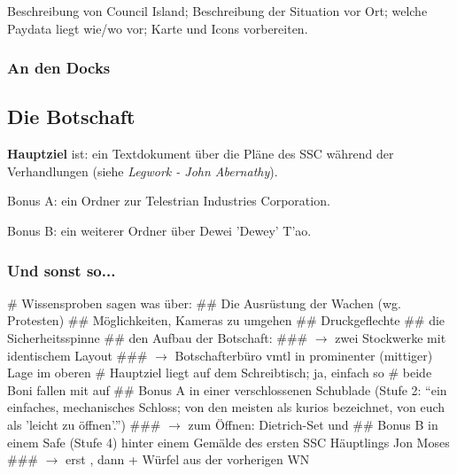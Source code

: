 Beschreibung von Council Island; Beschreibung der Situation vor Ort; welche Paydata liegt wie/wo vor; Karte und Icons vorbereiten.

\subsubsection{An den Docks}



\subsection{Die Botschaft}

\textbf{Hauptziel} ist: ein Textdokument über die Pläne des SSC während der Verhandlungen (siehe \textit{Legwork - John Abernathy}). 

Bonus A: ein Ordner zur Telestrian Industries Corporation. 

Bonus B: ein weiterer Ordner über Dewei 'Dewey' T'ao.

\subsubsection{Und sonst so...}

\begin{easylist}
    # Wissensproben sagen was über:
    ## Die Ausrüstung der Wachen (wg. Protesten)
    ## Möglichkeiten, Kameras zu umgehen
    ## Druckgeflechte
    ## die Sicherheitsspinne
    ## den Aufbau der Botschaft: 
    ### $\rightarrow$ zwei Stockwerke mit identischem Layout
    ### $\rightarrow$ Botschafterbüro vmtl in prominenter (mittiger) Lage im oberen
    # Hauptziel liegt auf dem Schreibtisch; ja, einfach so
    # beide Boni fallen mit  auf
    ## Bonus A in einer verschlossenen Schublade (Stufe 2: ``ein einfaches, mechanisches Schloss; von den meisten als kurios bezeichnet, von euch als 'leicht zu öffnen'.'')
    ### $\rightarrow$ zum Öffnen: Dietrich-Set und 
    ## Bonus B in einem Safe (Stufe 4) hinter einem Gemälde des ersten SSC Häuptlings Jon Moses
    ### $\rightarrow$ erst , dann  + Würfel aus der vorherigen WN
\end{easylist}


